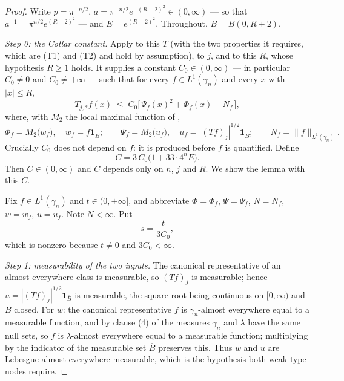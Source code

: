 \begin{proof}
Write $p = \pi^{-n/2}$, $a = \pi^{-n/2}e^{-(R+2)^2} \in (0,\infty)$ --- so that
$a^{-1} = \pi^{n/2}e^{(R+2)^2}$ --- and $E = e^{(R+2)^2}$.  Throughout,
$\overline B = \overline B(0,R+2)$.

\emph{Step 0: the Cotlar constant.}
Apply  to this $T$ (with the two properties it
requires, which are (T1) and (T2) and hold by assumption), to $j$, and to this
$R$, whose hypothesis $R \geq 1$ holds.  It supplies a constant
$C_0 \in (0,\infty)$ --- in particular $C_0 \neq 0$ and $C_0 \neq +\infty$ ---
such that for every $f \in L^1(\gamma_n)$ and every $x$ with $|x| \leq R$,
\begin{equation*}
  T_{j,*}f(x) \;\leq\; C_0\bigl[\,\Psi_f(x)^2 + \Phi_f(x) + N_f\,\bigr] ,
  \tag{1}
\end{equation*}
where, with $M_2$ the local maximal function of ,
\[
  \Phi_f = M_2\bigl(w_f\bigr),\quad w_f = f\mathbf 1_{\overline B};
  \qquad
  \Psi_f = M_2\bigl(u_f\bigr),\quad u_f = |(Tf)_j|^{1/2}\mathbf 1_{\overline B};
  \qquad
  N_f = \|f\|_{L^1(\gamma_n)} .
\]
Crucially $C_0$ does not depend on $f$: it is produced before $f$ is quantified.
Define
\[
  C = 3\,C_0\bigl(1 + 33\cdot4^n E\bigr) .
\]
Then $C \in (0,\infty)$ and $C$ depends only on $n$, $j$ and $R$.  We show the
lemma with this $C$.

Fix $f \in L^1(\gamma_n)$ and $t \in (0,+\infty]$, and abbreviate
$\Phi = \Phi_f$, $\Psi = \Psi_f$, $N = N_f$, $w = w_f$, $u = u_f$.  Note
$N < \infty$.  Put
\[
  s = \frac{t}{3C_0} ,
\]
which is nonzero because $t \neq 0$ and $3C_0 < \infty$.

\emph{Step 1: measurability of the two inputs.}
The canonical representative of an almost-everywhere class is measurable, so
$(Tf)_j$ is measurable; hence $u = |(Tf)_j|^{1/2}\mathbf 1_{\overline B}$ is
measurable, the square root being continuous on $[0,\infty)$ and
$\overline B$ closed.  For $w$: the canonical representative $f$ is
$\gamma_n$-almost everywhere equal to a measurable function, and by clause (4)
of  the measures $\gamma_n$ and $\lambda$
have the same null sets, so $f$ is $\lambda$-almost everywhere equal to a
measurable function; multiplying by the indicator of the measurable set
$\overline B$ preserves this.  Thus $w$ and $u$ are Lebesgue-almost-everywhere
measurable, which is the hypothesis both weak-type nodes require.


\end{proof}
